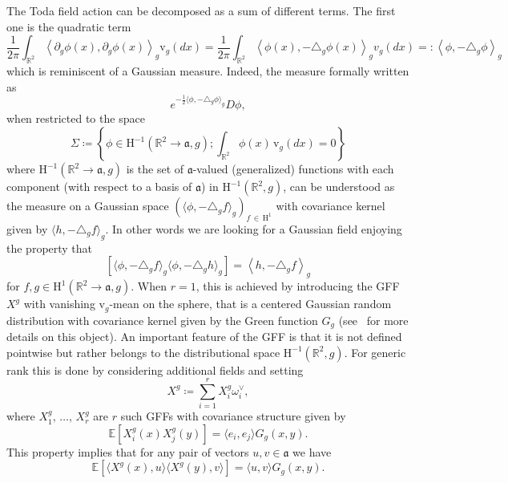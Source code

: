 \documentclass[AHL,Unicode,longabstracts,published]{cedram}
\newcommand{\frka}{\mathfrak{a}}
\newcommand{\rmv}{\mathrm{v}}
\newcommand{\rmH}{\mathrm{H}}
\newcommand{\R}{\mathbb{R}}
\newcommand{\E}{\mathbb{E}}
\newcommand{\ps}[1]{\langle #1 \rangle}
\newcommand*\green[1]{#1}
\begin{document}
The Toda field action can be decomposed as a sum of different terms. The first one is the quadratic term
\[
\frac{1}{2\pi}\int_{\R^2}\left\langle\partial_g\phi(x),\partial_g\phi(x)\right\rangle_g\rmv_g(dx)=\frac{1}{2\pi}\int_{\R^2}\left\langle\phi(x),-\triangle_g\phi(x)\right\rangle_gv_g(dx)=:\left\langle\phi,-\triangle_g\phi\right\rangle_g
\]
which is reminiscent of a Gaussian measure. Indeed, the measure formally written as
\begin{equation}\label{GPI}
e^{-\frac{1}{2}\ps{\phi,-\triangle_g\phi}_g}D\phi,
\end{equation}
when restricted to the space
\[
\Sigma\coloneqq \left\{\phi\in \rmH^{-1}\left(\R^2\to\frka,g\right); \int_{\R^2} \green\phi(x)\, \rmv_g(dx)=0\right\}
\]
where $ \rmH^{-1}(\R^2\to\frka,g)$ is the set of $\frka$-valued (generalized) functions with each component (with respect to a basis of $\frka$) in $\rmH^{-1}(\R^2,g)$, can be understood as the measure on a Gaussian space $\left(\ps{\phi,-\triangle_g f}_g\right)_{f\,\in\,\rmH^{1}}$ with covariance kernel given by $\ps{h,-\triangle_g f}_g$. In other words we are looking for a Gaussian field enjoying the property that
\begin{equation}\label{eq:GFF_cov1}
\left[\ps{\phi,-\triangle_g f}_g\ps{\phi,-\triangle_g h}_g\right]=\left\langle h,-\triangle_g f\right\rangle_g
\end{equation}
for $f,g\in \rmH^{1}(\R^2\to\frka,g)$. When $r=1$, this is achieved by introducing the GFF $X^g$ with vanishing $\rmv_g$-mean on the sphere, that is a centered Gaussian random distribution with covariance kernel given by the Green function $G_g$ (see~\cite{dubedat,She07} for more details on this object). An important feature of the GFF is that it is not defined pointwise but rather belongs to the distributional space $\rmH^{-1}(\R^2,g)$. For generic rank this is done by considering additional fields and setting
\begin{equation}
X^g\coloneqq \sum_{i=1}^{r}X^g_i\omega_i^\vee,
\end{equation}
where $X^g_1,\,\dots,\,X^g_{r}$ are $r$ such GFFs with covariance structure given by
\begin{equation}\label{GFF_covariance}
\E\left[X^g_i(x) X^g_j(y)\right]=\ps{e_i,e_j} G_g(x,y).
\end{equation}
This property implies that for any pair of vectors $u,v\in\frka$ we have
\begin{equation}\label{GFF_covariance2}
\E\left[\ps{X^g(x),u}\ps{X^g(y),v}\right]=\ps{u,v} G_g(x,y).
\end{equation}
\end{document}
